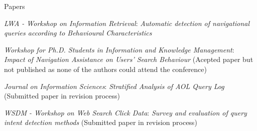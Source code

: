 \begin{rubric}{Papers}

	\entry*[2008]  
	\textit{LWA - Workshop on Information Retrieval}: \emph{Automatic detection of navigational queries according to Behavioural Characteristics}

	\entry*  
	\textit{Workshop for Ph.D. Students in Information and Knowledge Management}: \emph{Impact of Navigation Assistance on Users' Search Behaviour} (Acepted paper but not published as none of the authors could attend the conference)

	\entry*  
	\textit{Journal on Information Sciences}: \emph{Stratified Analysis of AOL Query Log} (Submitted paper in revision process)

	\entry*[2009]
	\textit{WSDM - Workshop on Web Search Click Data}: \emph{Survey and evaluation of query intent detection methods} (Submitted paper in revision process)
	
\end{rubric}
